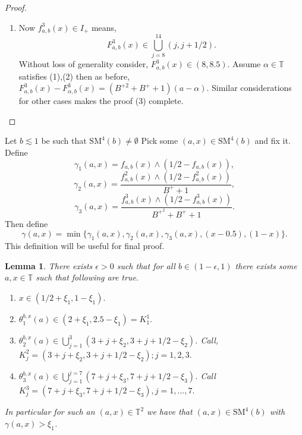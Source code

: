 \documentclass[12pt]{amsart}
\numberwithin{equation}{section}
\newtheorem{lemma}[theorem]{Lemma}
\theoremstyle{remark}
\begin{document}
\begin{proof}
\begin{enumerate}
    \vspace{.3cm}

    \item Now $f_{a,b}^3(x) \in I_+$ means, \[
    F_{a,b}^3(x) \in \bigcup_{j=8}^{14}(j,j+1/2).
    \]
    Without loss of generality consider, $F_{a,b}^3(x) \in (8,8.5)$. Assume $\alpha \in \mathbb{T}$ satisfies (1),(2) then as before, $F_{a,b}^3(x)-F_{\alpha,b}^3(x)=(B^{+{2}}+B^++1)(a-\alpha)$. Similar considerations for other cases makes the proof (3) complete.
\end{enumerate}
 
\end{proof}
  Let $b\lesssim1$ be such that $\text{SM}^4(b) \neq \emptyset$
    Pick some $(a,x)\in \text{SM}^{4}(b)$ and fix it. Define \[
    \gamma_1(a,x)=f_{a,b}(x) \wedge (1/2-f_{a,b}(x)),\]
    \[\gamma_2(a,x)=\dfrac{f^2_{a,b}(x) \wedge (1/2-f^2_{a,b}(x))}{B^++1},\]
   \[ \gamma_3(a,x)= \dfrac{f^3_{a,b}(x) \wedge (1/2-f^3_{a,b}(x))}{B^{+^{2}}+B^++1}.
    \]
    Then define \[\gamma(a,x)=\min \{\gamma_1(a,x),\gamma_2(a,x),\gamma_3(a,x),(x-0.5),(1-x)\}.\] This definition will be useful for final proof.\\
\begin{lemma}\label{set up 2}
        There exists $\epsilon>0$ such that for all $b \in (1-\epsilon,1)$ there exists some $a,x \in \mathbb{T}$ such that following are true. 
        \begin{enumerate}
            \item $x \in (1/2+\xi_1, 1-\xi_1).$
            \vspace{.2cm}
            \item $\theta_1^{b,x}(a) \in (2+\xi_1,2.5-\xi_1)=K^1_{1}.$
            \vspace{.2cm}
            \item $\theta_2^{b,x}(a) \in \bigcup_{j=1}^{3}(3+j+\xi_2,3+j+1/2-\xi_2) $. Call, $K^2_{j}=(3+j+\xi_2,3+j+1/2-\xi_2); j=1,2,3.$
            \vspace{.2cm}
            \item $\theta_3^{b,x}(a) \in \bigcup_{j=1}^{j=7}(7+j+\xi_3,7+j+1/2-\xi_3)$. Call $K^3_{j}=(7+j+\xi_3,7+j+1/2-\xi_3), j=1,...,7.$
        \end{enumerate}
        In particular for such an $(a,x)\in \mathbb{T}^2$ we have that $(a,x)\in \text{SM}^4(b)$ with $\gamma(a,x)>\xi_1$.
    
    \end{lemma}
\end{document}
